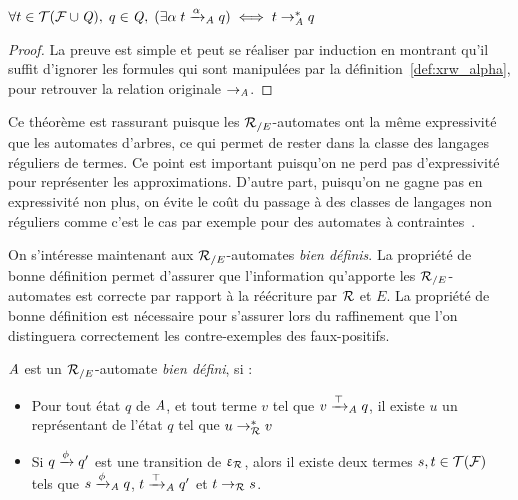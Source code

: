 \begin{theorem}\label{th:equiv}{\quad\quad
  $\forall t\in\mathcal{ T(F \cup \mathit Q)},\; q \in \mathit Q,\; (\exists \alpha\; t \xrightarrow{\alpha}_\mathit A q) \; \Longleftrightarrow \; t \rightarrow_\mathit A^* q$}
\end{theorem}

\begin{proof}
  La preuve est simple et peut se réaliser par induction en montrant qu'il suffit
  d'ignorer les formules qui sont manipulées par la définition~\ref{def:xrw_alpha},
  pour retrouver la relation originale $\rightarrow_\mathit A$. 
\end{proof}

Ce théorème est rassurant puisque les ${\mathcal R_{/E}}$-automates ont la même expressivité
que les automates d'arbres, ce qui permet de rester dans la classe des langages réguliers
de termes. Ce point est important puisqu'on ne perd pas d'expressivité pour représenter les
approximations. D'autre part, puisqu'on ne gagne pas en expressivité
non plus, on évite le coût du passage à des classes de langages non réguliers
comme c'est le cas par exemple pour des automates à contraintes~\cite{TATA}.


On s'intéresse maintenant aux ${\mathcal R_{/E}}$-automates {\em bien définis}. 
La propriété de bonne définition permet d'assurer que l'information
qu'apporte les ${\mathcal R_{/E}}$-automates est correcte par rapport à la réécriture
par $\mathcal R$ et $E$. La propriété de bonne définition est nécessaire pour s'assurer 
lors du raffinement que l'on distinguera correctement les contre-exemples des faux-positifs.


\begin{definition}
  \label{def:well-defined}
  $\mathit A$ est un ${\mathcal R_{/E}}$-automate \emph{bien défini}, si :
  \begin{itemize}
  \item Pour tout état $q$ de $\mathit A$, et tout terme $v$ tel que
    $v \xrightarrow{\top}_\mathit A q$, il existe $u$ un représentant de l'état $q$ tel que $u \rightarrow^*_\mathcal R v$
  \item Si $q \xrightarrow{\phi} q'$ est une transition de $\upvarepsilon_{\mathcal R}$, alors il existe deux termes
    $s,t\in \mathcal{T(F)}$ tels que $s\xrightarrow{\phi}_\mathit A q$, $t\xrightarrow{\top}_\mathit A q'$
    et $t \rightarrow_\mathcal R s$.
  \end{itemize}
\end{definition}


